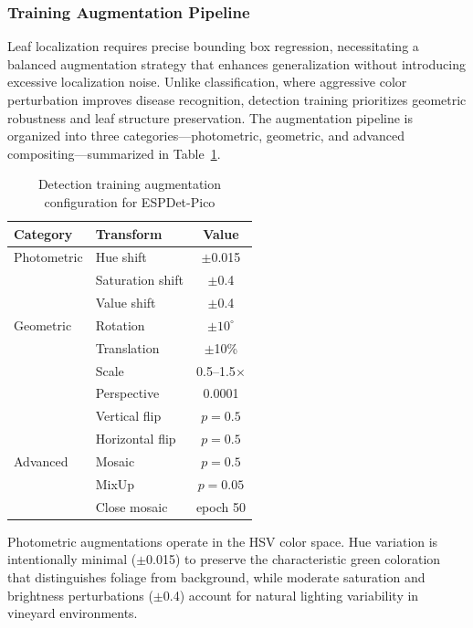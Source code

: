 \subsubsection*{Training Augmentation Pipeline}

Leaf localization requires precise bounding box regression, necessitating a balanced augmentation strategy that enhances generalization without introducing excessive localization noise. Unlike classification, where aggressive color perturbation improves disease recognition, detection training prioritizes geometric robustness and leaf structure preservation. The augmentation pipeline is organized into three categories---photometric, geometric, and advanced compositing---summarized in Table~\ref{tab:detection_augmentation}.

\begin{table}[htbp]
\centering
\caption{Detection training augmentation configuration for ESPDet-Pico}
\label{tab:detection_augmentation}
\small
\begin{tabular}{llc}
\toprule
\textbf{Category} & \textbf{Transform} & \textbf{Value} \\
\midrule
Photometric        & Hue shift          & $\pm$0.015 \\
                   & Saturation shift   & $\pm$0.4   \\
                   & Value shift        & $\pm$0.4   \\
\midrule
Geometric          & Rotation           & $\pm 10^\circ$  \\
                   & Translation        & $\pm$10\%       \\
                   & Scale              & 0.5--1.5$\times$ \\
                   & Perspective        & 0.0001          \\
                   & Vertical flip      & $p = 0.5$       \\
                   & Horizontal flip    & $p = 0.5$       \\
\midrule
Advanced           & Mosaic             & $p = 0.5$       \\
                   & MixUp              & $p = 0.05$      \\
                   & Close mosaic       & epoch 50        \\
\bottomrule
\end{tabular}
\end{table}

Photometric augmentations operate in the HSV color space. Hue variation is intentionally minimal ($\pm$0.015) to preserve the characteristic green coloration that distinguishes foliage from background, while moderate saturation and brightness perturbations ($\pm$0.4) account for natural lighting variability in vineyard environments.

